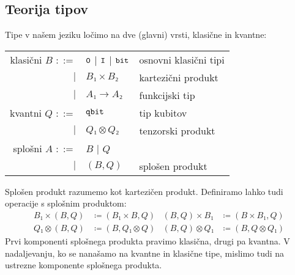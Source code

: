 \subsection{Teorija tipov}
Tipe v našem jeziku ločimo na dve (glavni) vrsti, klasične in kvantne:\\
\begin{tabular}{r l l}%
    klasični \(B\) \(::=\)& \(\text{\ttfamily0}\) \(\mid\) \(\text{\ttfamily I}\)
                  \(\mid\)  \(\text{\ttfamily bit}\)                                       & osnovni klasični tipi\\
                  \(\mid\)& \(B₁×B₂\)                                      & kartezični produkt\\
                  \(\mid\)& \(A₁ → A₂\)                                    & funkcijski tip\\
    kvantni \(Q\) \(::=\)&  \(\text{\ttfamily qbit}\)                                      & tip kubitov\\
                 \(\mid\)&  \(Q₁⊗Q₂\)                                      & tenzorski produkt\\
    splošni \(A\) \(::=\)&  \(B\) \(\mid\) \(Q\)                           &\\
                 \(\mid\)&  \((B,Q)\)                                      & splošen produkt\\
\end{tabular}
\begin{remark}
    Splošen produkt razumemo kot kartezičen produkt.
    Definiramo lahko tudi operacije s splošnim produktom:
    \begin{align*}
        B₁×(B,Q) &≔ (B₁×B,Q) & (B,Q)×B₁ &≔ (B×B₁,Q)\\
        Q₁⊗(B,Q) &≔ (B,Q₁⊗Q) & (B,Q)⊗Q₁ &≔ (B,Q⊗Q₁)
    \end{align*}
    Prvi komponenti splošnega produkta pravimo klasična, drugi pa kvantna.
    V nadaljevanju, ko se nanašamo na kvantne in klasične tipe, mislimo tudi na ustrezne komponente splošnega produkta.
\end{remark}



